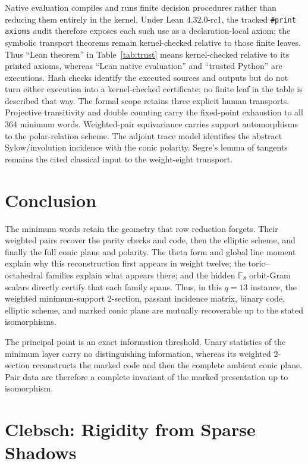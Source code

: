 \documentclass[11pt]{article}
\theoremstyle{definition}
\theoremstyle{remark}
\newcommand{\F}{\mathbb F}
\begin{document}
Native evaluation compiles and runs finite decision procedures rather than
reducing them entirely in the kernel.  Under Lean \(4.32.0\)-rc1, the
tracked \texttt{\#print axioms} audit therefore exposes each such use as a
declaration-local axiom; the symbolic transport theorems remain
kernel-checked relative to those finite leaves.
Thus ``Lean theorem'' in Table~\ref{tab:trust} means kernel-checked relative
to its printed axioms, whereas ``Lean native evaluation'' and ``trusted
Python'' are executions.  Hash checks identify the executed sources and
outputs but do not turn either execution into a kernel-checked certificate;
no finite leaf in the table is described that way.
The formal scope retains three explicit human transports.  Projective
transitivity and double counting carry the fixed-point exhaustion to all
\(364\) minimum words.  Weighted-pair equivariance carries support
automorphisms to the polar-relation scheme.  The adjoint trace model
identifies the abstract Sylow/involution incidence with the conic polarity.
Segre's lemma of tangents remains the cited classical input to the
weight-eight transport.

\section{Conclusion}

The minimum words retain the geometry that row reduction forgets.  Their
weighted pairs recover the parity checks and code, then the elliptic scheme,
and finally the full conic plane and polarity.  The theta form and global
line moment explain why this reconstruction first appears in weight twelve;
the toric--octahedral families explain what appears there; and the hidden
\(\F_8\) orbit-Gram scalars directly certify that each family spans.  Thus,
in this \(q=13\) instance, the weighted minimum-support \(2\)-section, passant incidence
matrix, binary code, elliptic scheme, and marked conic plane are mutually
recoverable up to the stated isomorphisms.

The principal point is an exact information threshold.  Unary statistics of
the minimum layer carry no distinguishing information, whereas its weighted
\(2\)-section reconstructs the marked code and then the complete ambient
conic plane.  Pair data are therefore a complete invariant of the marked
presentation up to isomorphism.

\clearpage
\section*{Clebsch: Rigidity from Sparse Shadows}
\end{document}
